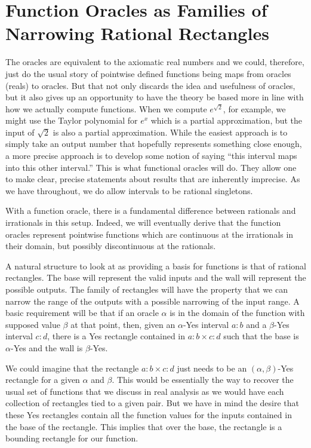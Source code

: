 \documentclass[12pt]{article}
\begin{document}
\section{Function Oracles as Families of Narrowing Rational Rectangles}\label{sec:funora}

The oracles are equivalent to the axiomatic real numbers and we could, therefore, just do the usual story of pointwise defined functions being maps from oracles (reals) to oracles. But that not only discards the idea and usefulness of oracles, but it also gives up an opportunity to have the theory be based more in line with how we actually compute functions. When we compute $e^{\sqrt{2}}$, for example, we might use the Taylor polynomial for $e^x$ which is a partial approximation, but the input of $\sqrt{2}$ is also a partial approximation. While the easiest approach is to simply take an output number that hopefully represents something close enough, a more precise approach is to develop some notion of saying ``this interval maps into this other interval.'' This is what functional oracles will do. They allow one to make clear, precise statements about results that are inherently imprecise. As we have throughout, we do allow intervals to be rational singletons. 

With a function oracle, there is a fundamental difference between rationals and irrationals in this setup. Indeed, we will eventually derive that the function oracles represent pointwise functions which are continuous at the irrationals in their domain, but possibly discontinuous at the rationals.

A natural structure to look at as providing a basis for functions is that of rational rectangles. The base will represent the valid inputs and the wall will represent the possible outputs. The family of rectangles will have the property that we can narrow the range of the outputs with a possible narrowing of the input range. A basic requirement will be that if an oracle $\alpha$ is in the domain of the function with supposed value $\beta$ at that point, then, given an $\alpha$-Yes interval $a:b$ and a $\beta$-Yes interval $c:d$, there is a Yes rectangle contained in $a:b \times c:d$ such that the base is $\alpha$-Yes and the wall is $\beta$-Yes. 

We could imagine that the rectangle $a:b \times c:d$ just needs to be an $(\alpha, \beta)$-Yes rectangle for a given $\alpha$ and $\beta$. This would be essentially the way to recover the usual set of functions that we discuss in real analysis as we would have each collection of rectangles tied to a given pair. But we have in mind the desire that these Yes rectangles contain all the function values for the inputs contained in the base of the rectangle. This implies that over the base, the rectangle is a bounding rectangle for our function. 
\end{document}
